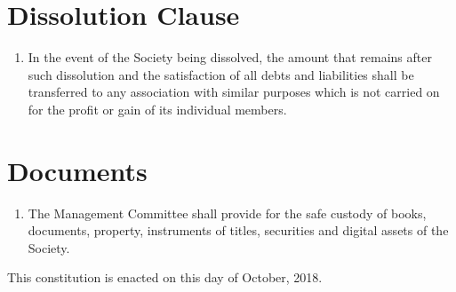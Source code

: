 \documentclass[a4paper]{article}
\newcommand*{\sectionr}[1]{{\raggedright \section{#1}}}
\begin{document}
\sectionr{Dissolution Clause}
\begin{enumerate}
\item In the event of the Society being dissolved, the amount that remains after such dissolution and the satisfaction of all debts and liabilities shall be transferred to any association with similar purposes which is not carried on for the profit or gain of its individual members.
\end{enumerate}

\sectionr{Documents}
\begin{enumerate}
\item The Management Committee shall provide for the safe custody of books, documents, property, instruments of titles, securities and digital assets of the Society.
\end{enumerate}

\vspace{\fill}
This constitution is enacted on this  day of October, 2018.
\end{document}
